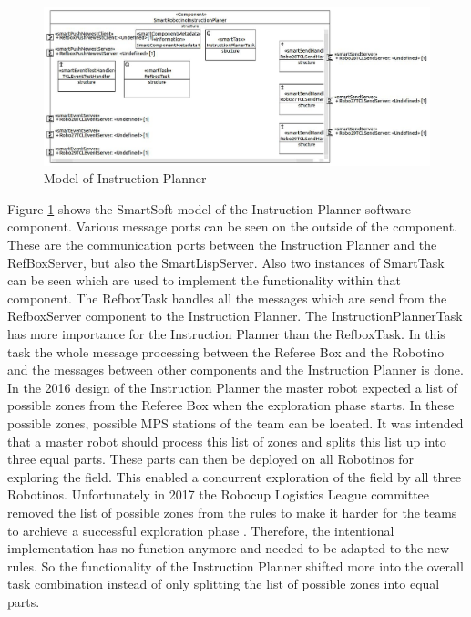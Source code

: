 \begin{figure}
\centering
\includegraphics[scale=0.5]{pic/SmartRobotinoInstructionPlaner.JPG}
\caption{Model of Instruction Planner}
\label{fig:i_overview}
\end{figure}

Figure \ref{fig:i_overview} shows the SmartSoft model of the Instruction Planner software component. Various message ports can be seen on the outside of the component. These are the communication ports between the Instruction Planner and the RefBoxServer, but also the SmartLispServer. Also two instances of SmartTask can be seen which are used to implement the functionality within that component. The RefboxTask handles all the messages which are send from the RefboxServer component to the Instruction Planner. The InstructionPlannerTask has more importance for the Instruction Planner than the RefboxTask. In this task the whole message processing between the Referee Box and the Robotino and the messages between other components and the Instruction Planner is done. \\


In the 2016 design of the Instruction Planner the master robot expected a list of possible zones from the Referee Box when the exploration phase starts. In these possible zones, possible MPS stations of the team can be located. It was intended that a master robot should process this list of zones and splits this list up into three equal parts. These parts can then be deployed on all Robotinos for exploring the field. This enabled a concurrent exploration of the field by all three Robotinos.  Unfortunately in 2017 the Robocup Logistics League committee removed the list of possible zones from the rules to make it harder for the teams to archieve a successful exploration phase \cite{RC17}. Therefore, the intentional implementation has no function anymore and needed to be adapted to the new rules. So the functionality of the Instruction Planner shifted more into the overall task combination instead of only splitting the list of possible zones into equal parts. \\



